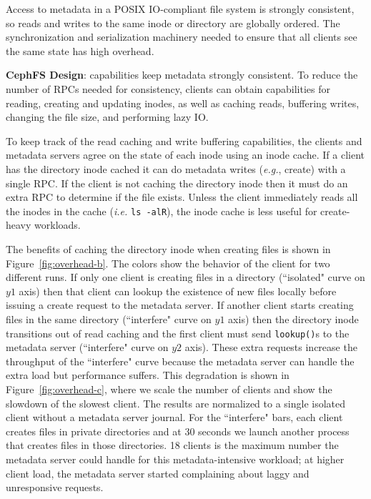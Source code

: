 Access to metadata in a POSIX IO-compliant file system is strongly consistent, so
reads and writes to the same inode or directory are globally ordered.  The
synchronization and serialization machinery needed to ensure that all clients
see the same state has high overhead.

\textbf{CephFS Design}: capabilities keep metadata strongly
consistent. To reduce the number of RPCs needed for consistency, clients can
obtain capabilities for reading, creating and updating inodes, as well as caching reads,
buffering writes, changing the file size, and performing lazy IO.

To keep track of the read caching and write buffering capabilities, the clients
and metadata servers agree on the state of each inode using an inode cache.  If
a client has the directory inode cached it can do metadata writes ({\it e.g.},
create) with a single RPC. If the client is not caching the directory inode
then it must do an extra RPC to determine if the file exists.  Unless the
client immediately reads all the inodes in the cache ({\it i.e.} \texttt{ls
-alR}), the inode cache is less useful for create-heavy workloads.

The benefits of caching the directory inode when creating files is shown in
Figure~\ref{fig:overhead-b}. The colors show the behavior of the client for two
different runs.  If only one client is creating files in a directory
(``isolated" curve on \(y1\) axis) then that client can lookup the existence of
new files locally before issuing a create request to the metadata server. If
another client starts creating files in the same directory (``interfere" curve
on \(y1\) axis) then the directory inode transitions out of read caching and
the first client must send \texttt{lookup()}s to the metadata server
(``interfere" curve on \(y2\) axis). These extra requests increase the
throughput of the ``interfere" curve because the metadata server can handle the
extra load but performance suffers.  This degradation is shown in
Figure~\ref{fig:overhead-c}, where we scale the number of clients and show the
slowdown of the slowest client.  The results are normalized to a single
isolated client without a metadata server journal.  For the ``interfere" bars,
each client creates files in private directories and at 30 seconds we launch
another process that creates files in those directories. 18 clients is the
maximum number the metadata server could handle for this metadata-intensive
workload; at higher client load, the metadata server started complaining about
laggy and unresponsive requests.

